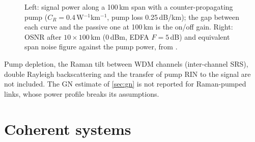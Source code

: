 \begin{figure}[htbp]
\centering
{}
\caption{Left: signal power along a 100\,km span with a counter-propagating pump ($C_R=0.4$\,W$^{-1}$km$^{-1}$,
pump loss 0.25\,dB/km); the gap between each curve and the passive one at 100\,km is the on/off gain. Right: OSNR after
$10\times100$\,km (0\,dBm, EDFA $F=5$\,dB) and equivalent span noise figure against the pump power, from
.}
\label{fig:raman}
\end{figure}

\begin{pitfall}
Pump depletion, the Raman tilt between WDM channels (inter-channel SRS), double Rayleigh
backscattering and the transfer of pump RIN to the signal are not included. The GN estimate of
\cref{sec:gn} is not reported for Raman-pumped links, whose power profile breaks its assumptions.
\end{pitfall}

\section{Coherent systems}\label{sec:coherent}
